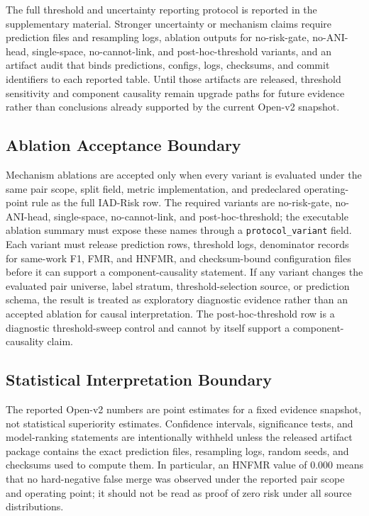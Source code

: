 \documentclass[11pt]{article}
\begin{document}
The full threshold and uncertainty reporting protocol is reported in the supplementary material. Stronger uncertainty or mechanism claims require prediction files and resampling logs, ablation outputs for no-risk-gate, no-ANI-head, single-space, no-cannot-link, and post-hoc-threshold variants, and an artifact audit that binds predictions, configs, logs, checksums, and commit identifiers to each reported table. Until those artifacts are released, threshold sensitivity and component causality remain upgrade paths for future evidence rather than conclusions already supported by the current Open-v2 snapshot.

\subsection{Ablation Acceptance Boundary}

Mechanism ablations are accepted only when every variant is evaluated under the same pair scope, split field, metric implementation, and predeclared operating-point rule as the full IAD-Risk row. The required variants are no-risk-gate, no-ANI-head, single-space, no-cannot-link, and post-hoc-threshold; the executable ablation summary must expose these names through a \texttt{protocol\_variant} field. Each variant must release prediction rows, threshold logs, denominator records for same-work F1, FMR, and HNFMR, and checksum-bound configuration files before it can support a component-causality statement. If any variant changes the evaluated pair universe, label stratum, threshold-selection source, or prediction schema, the result is treated as exploratory diagnostic evidence rather than an accepted ablation for causal interpretation. The post-hoc-threshold row is a diagnostic threshold-sweep control and cannot by itself support a component-causality claim.

\subsection{Statistical Interpretation Boundary}

The reported Open-v2 numbers are point estimates for a fixed evidence snapshot, not statistical superiority estimates. Confidence intervals, significance tests, and model-ranking statements are intentionally withheld unless the released artifact package contains the exact prediction files, resampling logs, random seeds, and checksums used to compute them. In particular, an HNFMR value of 0.000 means that no hard-negative false merge was observed under the reported pair scope and operating point; it should not be read as proof of zero risk under all source distributions.
\end{document}
